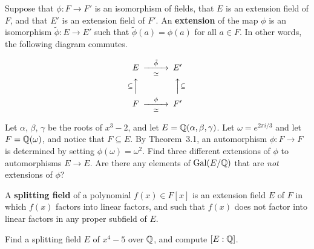 \begin{definition}
    Suppose that $\phi:F \longrightarrow F'$ is an isomorphism of fields, that $E$ is an extension field of $F$, and that $E'$ is an extension field of $F'$. An \textbf{extension} of the map $\phi$ is an isomorphism $\tilde{\phi}:E\longrightarrow E'$ such that $\tilde{\phi}(a)=\phi(a)$ for all $a\in F$. In other words, the following diagram commutes.
\begin{annotation}
\end{annotation}
    $$
    \begin{CD}
        E              @>\tilde{\phi}>\simeq>   E' \\
        @A\subseteq AA                          @AA\subseteq A \\
        F              @>\phi>\simeq>           F'
    \end{CD}
    $$
\end{definition}

\begin{problem}\label{prob:3exts}
    Let $\alpha$, $\beta$, $\gamma$ be the roots of $x^3-2$, and let $E = \mathbb{Q}(\alpha,\beta,\gamma)$. Let $\omega = e^{2\pi i/3}$ and let $F=\mathbb{Q}(\omega)$, and notice that $F\subseteq E$. By Theorem~3.1, an automorphism $\phi:F\longrightarrow F$ is determined by setting $\phi(\omega)=\omega^2$. Find three different extensions of $\phi$ to automorphisms $E\longrightarrow E$. Are there any elements of $\operatorname{Gal}(E/\mathbb{Q})$ that are \textit{not} extensions of $\phi$?
\end{problem}

\begin{definition}
    A \textbf{splitting field} of a polynomial $f(x)\in F[x]$ is an extension field $E$ of $F$ in which $f(x)$ factors into linear factors, and such that $f(x)$ does not factor into linear factors in any proper subfield of $E$.
\end{definition}

\begin{problem}\label{prob:x4m5split}
Find a splitting field $E$ of $x^4-5$ over $\mathbb{Q}$, and compute $[E:\mathbb{Q}]$.
\begin{annotation}
\end{annotation}
\end{problem}

